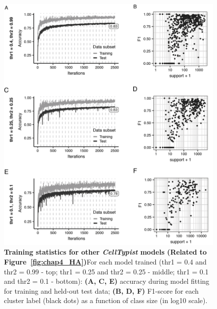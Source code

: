 \begin{figure}[ht!] 
\centering    
\includegraphics[width=1.0\textwidth]{Appendix2/Figs/appB_modelstuff.png} %
\caption[Training statistics for other \textit{CellTypist} models]{\textbf{Training statistics for other \textit{CellTypist} models (Related to Figure~\ref{fig:chap4_HA})}\newline For each model trained (thr1 = 0.4 and thr2 = 0.99 - top; thr1 = 0.25 and thr2 = 0.25 - middle; thr1 = 0.1 and thr2 = 0.1 - bottom): \textbf{(A, C, E)} accuracy during model fitting for training and held-out test data; \textbf{(B, D, F)} F1-score for each cluster label (black dots) as a function of class size (in log10 scale).}
\label{fig:appB_moremodels}
\end{figure}


